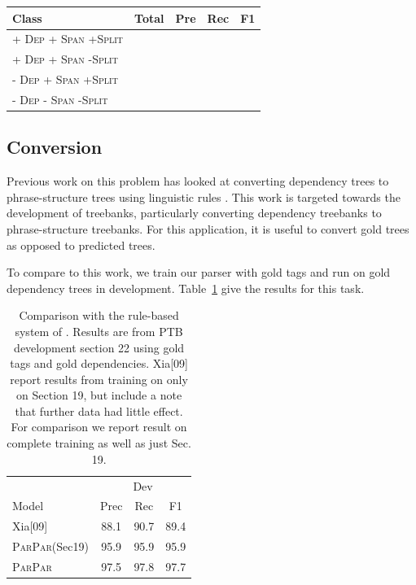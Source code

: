 \documentclass[11pt,letterpaper]{article}
\newcommand{\ParseName}{\textsc{ParPar}}
\begin{document}
\begin{table}
  \centering
  \begin{tabular}{|l|cccc|}
    \hline
    Class                 & Total & Pre & Rec & F1 \\ 
    \hline
    \textsc{+ Dep + Span +Split} &       &     &     &   \\ 
    \textsc{+ Dep + Span -Split} &       &     &     &   \\ 
    \textsc{- Dep + Span +Split} &       &     &     &   \\ 
    \textsc{- Dep - Span -Split} &       &     &     &   \\ 
    \hline
  \end{tabular}
\end{table}

\subsection{Conversion}

Previous work on this problem has looked at converting dependency trees to phrase-structure trees using linguistic rules \cite{xia2001converting,xia2009towards}. This work is targeted towards the development of treebanks, particularly converting dependency treebanks to phrase-structure treebanks.
For this application, it is useful to convert gold trees as opposed to predicted trees.

To compare to this work, we train our parser with gold tags and run on gold dependency trees in development. Table~\ref{tab:convert} give the results for this task.


\begin{table}
  \centering
  \begin{tabular}{|l|ccc|}

    \hline
    & \multicolumn{3}{|c|}{Dev} \\
    Model & Prec & Rec & F1  \\
    \hline

    \hline
    Xia[09]  & 88.1 & 90.7 & 89.4 \\
    \ParseName(Sec19) & 95.9  & 95.9 & 95.9    \\
    \ParseName  & 97.5 &  97.8 & 97.7    \\
    \hline

  \end{tabular}
  \caption{Comparison with the rule-based system of .
    Results are from PTB development section 22 using gold tags and gold
    dependencies.
    Xia[09] report results from training on only on Section 19, but
    include a note that further data had little effect.
    For comparison we report result on complete training as well as just Sec. 19.
  }
  \label{tab:convert}
\end{table}
\end{document}
